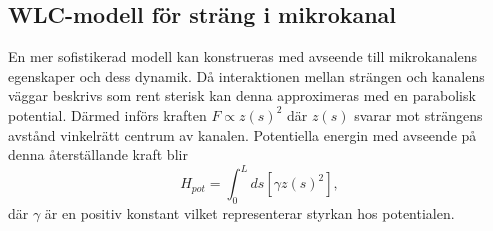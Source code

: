 \subsection{WLC-modell för sträng i mikrokanal}

En mer sofistikerad modell kan konstrueras med avseende till mikrokanalens egenskaper och dess dynamik. Då interaktionen mellan strängen och kanalens väggar beskrivs som rent sterisk \cite{Koster_etal2007} kan denna approximeras med en parabolisk potential. Därmed införs kraften $F \propto z(s)^2$ där $z(s)$ svarar mot strängens avstånd vinkelrätt centrum av kanalen. Potentiella energin med avseende på denna återställande kraft blir
\begin{equation}
    H_{pot}=\int_{0}^{L} ds[\gamma z(s)^2],
\end{equation}
där $\gamma$ är en positiv konstant vilket representerar styrkan hos potentialen. 

